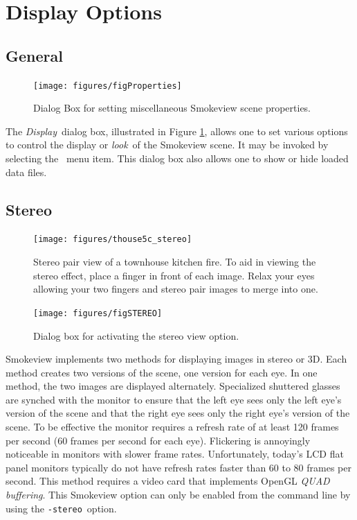 \documentclass[11pt,twoside]{book}
\newcommand{\figoptions}{hbp}
\begin{document}
\section{Display Options}
\subsection{General}
\begin{figure}[\figoptions]
\centerline{\texttt{[image: figures/figProperties]}
} \caption [Dialog Box for setting miscellaneous Smokeview scene
properties.] {Dialog Box for setting miscellaneous Smokeview scene
properties.} \label{figProperties}
\end{figure}
The {\em Display}\ dialog box, illustrated in Figure \ref{figProperties},
allows one to set various options to control the display or
{\em look}\ of the Smokeview scene.  It may be invoked by selecting
the \ menu item.  This dialog box also
allows one to show or hide loaded data files.


\subsection{Stereo}
\begin{figure}[\figoptions]
\begin{center}
\texttt{[image: figures/thouse5c\_stereo]}
\caption[Stereo pair view of a townhouse kitchen fire.]{
Stereo pair view of a townhouse kitchen fire. To aid in viewing the stereo effect, place
a finger in front of each image.  Relax your eyes allowing your two fingers and stereo pair
images to merge into one.
}
\label{figstereo}
\end{center}
\end{figure}

\begin{figure}[\figoptions]
\begin{center}
\texttt{[image: figures/figSTEREO]}
\caption{Dialog
box for activating the stereo view option.}
\label{figstereodialog}
\end{center}
\end{figure}
Smokeview implements two methods for displaying images in stereo or 3D.
Each method creates two versions of the scene, one version for each eye.
In one method, the two images are displayed alternately.  Specialized shuttered glasses are synched
with the monitor to ensure that the left eye sees only the left eye's version of the scene and that the right eye sees only the right eye's version  of the scene. To be effective the monitor requires a refresh rate of at least 120 frames per second (60 frames per second for each eye).
Flickering is annoyingly noticeable in monitors with slower frame rates.  Unfortunately, today's LCD flat panel monitors typically do not have refresh rates faster than 60 to 80 frames per second.  This method requires a video card that implements OpenGL {\em QUAD buffering}.
This Smokeview option can only be enabled from the command line by using the {\tt -stereo}\
option.
\end{document}

